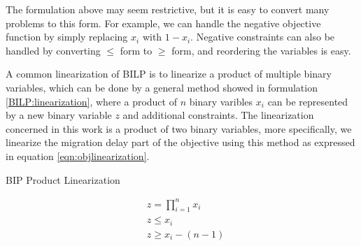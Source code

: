 The formulation above may seem restrictive, but it is easy to convert many problems to this form. For example, we can handle the negative objective function by simply replacing $x_i$ with $1-x_i$. Negative constraints can also be handled by converting $\leq$ form to $\geq$ form, and reordering the variables is easy.

A common linearization of BILP is to linearize a product of multiple binary variables, which can be done by a general method showed in formulation \ref{BILP:linearization}, 
where a product of $n$ binary varibles $x_i$ can be represented by a new binary variable $z$ and additional constraints. The linearization concerned in this work is a product of two binary variables, more specifically, we linearize the migration delay part of the objective using this method as expressed in equation \ref{eqn:objlinearization}.
\begin{problemenv}
	\caption{BIP Product Linearization}
	\label{BILP:linearization}
	\begin{equation}
		\begin{align}
			&z = \prod_{i=1}^n x_i\\
			&z \leq x_i\\
			&z \geq x_i-(n-1)
		\end{align}
	\end{equation}
\end{problemenv}


